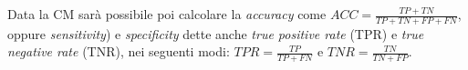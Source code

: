 Data la CM sarà possibile poi calcolare la \emph{accuracy} come $ACC = \frac{TP+TN}{TP+TN+FP+FN}$, oppure \emph{sensitivity}) e \emph{specificity} dette anche \emph{true positive rate} (TPR) e \emph{true negative rate} (TNR), nei seguenti modi: $TPR = \frac{TP}{TP+FN}$  e $TNR = \frac{TN}{TN+FP}$.
